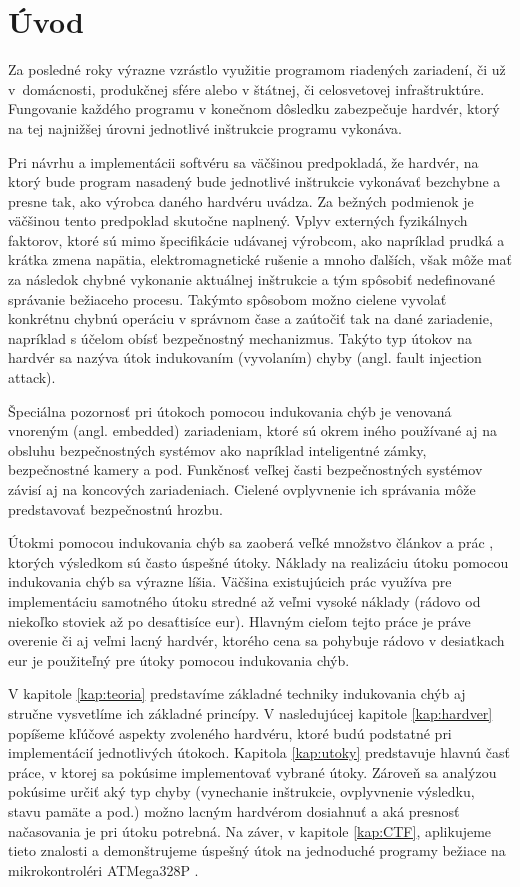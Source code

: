 \chapter*{Úvod} %

Za posledné roky výrazne vzrástlo využitie programom riadených zariadení, či už v~domácnosti, produkčnej sfére alebo v štátnej, či celosvetovej infraštruktúre. Fungovanie každého programu v konečnom dôsledku zabezpečuje hardvér, ktorý na tej najnižšej úrovni jednotlivé inštrukcie programu vykonáva. 

Pri návrhu a implementácii softvéru sa väčšinou predpokladá, že hardvér, na ktorý bude program nasadený bude jednotlivé inštrukcie vykonávať bezchybne a presne tak, ako výrobca daného hardvéru uvádza. Za bežných podmienok je väčšinou tento predpoklad skutočne naplnený. Vplyv externých fyzikálnych faktorov, ktoré sú mimo špecifikácie udávanej výrobcom, ako napríklad prudká a krátka zmena napätia, elektromagnetické rušenie a mnoho ďalších, však môže mať za následok chybné vykonanie aktuálnej inštrukcie a tým spôsobiť nedefinované správanie bežiaceho procesu. Takýmto spôsobom možno cielene vyvolať konkrétnu chybnú operáciu v správnom čase a zaútočiť tak na dané zariadenie, napríklad s účelom obísť bezpečnostný mechanizmus. Takýto typ útokov na hardvér sa nazýva útok indukovaním (vyvolaním) chyby (angl. fault injection attack).

Špeciálna pozornosť pri útokoch pomocou indukovania chýb je venovaná vnoreným (angl. embedded) zariadeniam, ktoré sú okrem iného používané aj na obsluhu bezpečnostných systémov ako napríklad inteligentné zámky, bezpečnostné kamery a pod. Funkčnosť veľkej časti bezpečnostných systémov závisí aj na koncových zariadeniach. Cielené ovplyvnenie ich správania môže predstavovať bezpečnostnú hrozbu. 

Útokmi pomocou indukovania chýb sa zaoberá veľké množstvo článkov a prác \cite{crowbars, clock, lowcost, crypto, emfi, powerGlitch, AntiFI}, ktorých výsledkom sú často úspešné útoky. Náklady na realizáciu útoku pomocou indukovania chýb sa výrazne líšia. Väčšina existujúcich prác využíva pre implementáciu samotného útoku stredné až veľmi vysoké náklady (rádovo od niekoľko stoviek až po desaťtisíce eur). Hlavným cieľom tejto práce je práve overenie či aj veľmi lacný hardvér, ktorého cena sa pohybuje rádovo v desiatkach eur je použiteľný pre útoky pomocou indukovania chýb.

V kapitole \ref{kap:teoria} predstavíme základné techniky indukovania chýb aj stručne vysvetlíme ich základné princípy. V nasledujúcej kapitole \ref{kap:hardver} popíšeme kľúčové aspekty zvoleného hardvéru, ktoré budú podstatné pri implementácií jednotlivých útokoch. Kapitola \ref{kap:utoky} predstavuje hlavnú časť práce, v ktorej sa pokúsime implementovať vybrané útoky. Zároveň sa analýzou pokúsime určiť aký typ chyby (vynechanie inštrukcie, ovplyvnenie výsledku, stavu pamäte a pod.) možno lacným hardvérom dosiahnuť a aká presnosť načasovania je pri útoku potrebná. Na záver, v kapitole \ref{kap:CTF}, aplikujeme tieto znalosti a demonštrujeme úspešný útok na jednoduché programy bežiace na mikrokontroléri ATMega328P \cite{atmegaData}.